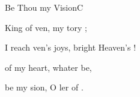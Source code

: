 \begin{song}{Be Thou my Vision}{C}
\begin{SBExtraKeys}
{\begin{SBVerse}
    \Ch{[Interlude: }{}   \Ch{A]}{}
  \end{SBVerse}


  \begin{SBVerse}
     King of ven, 
        my tory ;

     I reach ven's joys, 
         bright Heaven's !

     of my  heart, 
        whater be,

     be my sion, 
        O ler of .

    \Ch{[Interlude:}{}    \Ch{A]}{}
  \end{SBVerse}

  }\end{SBExtraKeys}
\end{song}

